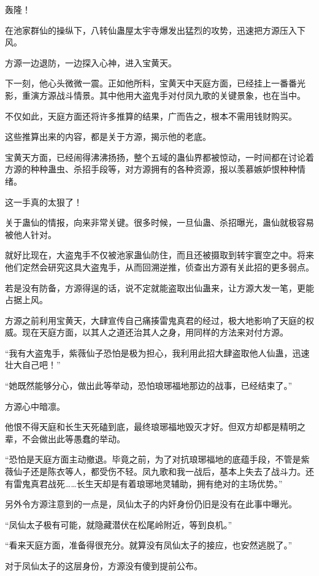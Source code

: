 \begin{this_body}
轰隆！

在池家群仙的操纵下，八转仙蛊屋太宇寺爆发出猛烈的攻势，迅速把方源压入下风。

方源一边退防，一边探入心神，进入宝黄天。

下一刻，他心头微微一震。正如他所料，宝黄天中天庭方面，已经挂上一番番光影，重演方源战斗情景。其中他用大盗鬼手对付凤九歌的关键景象，也在当中。

不仅如此，天庭方面还将许多推算的结果，广而告之，根本不需用钱财购买。

这些推算出来的内容，都是关于方源，揭示他的老底。

宝黄天方面，已经闹得沸沸扬扬，整个五域的蛊仙界都被惊动，一时间都在讨论着方源的种种蛊虫、杀招手段等，对方源拥有的各种资源，报以羡慕嫉妒恨种种情绪。

这一手真的太狠了！

关于蛊仙的情报，向来非常关键。很多时候，一旦仙蛊、杀招曝光，蛊仙就极容易被他人针对。

就好比现在，大盗鬼手不仅被池家蛊仙防住，而且还被摄取到转宇寰空之中。将来他们定然会研究这具大盗鬼手，从而回溯逆推，侦查出方源有关此招的更多弱点。

若是没有防备，方源得逞的话，说不定就能盗取出仙蛊来，让方源大发一笔，更能占据上风。

方源之前利用宝黄天，大肆宣传自己痛揍雷鬼真君的经过，极大地影响了天庭的权威。现在天庭方面，以其人之道还治其人之身，用同样的方法来对付方源。

“我有大盗鬼手，紫薇仙子恐怕是极为担心，我利用此招大肆盗取他人仙蛊，迅速壮大自己吧！”

“她既然能够分心，做出此等举动，恐怕琅琊福地那边的战事，已经结束了。”

方源心中暗凛。

他恨不得天庭和长生天死磕到底，最终琅琊福地毁灭才好。但双方却都是精明之辈，不会做出此等愚蠢的举动。

“恐怕是天庭方面主动撤退。毕竟之前，为了对抗琅琊福地的底蕴手段，不管是紫薇仙子还是陈衣等人，都受伤不轻。凤九歌和我一战后，基本上失去了战斗力。还有雷鬼真君战死……长生天却是有着琅琊地灵辅助，拥有绝对的主场优势。”

另外令方源注意到的一点是，凤仙太子的内奸身份仍旧是没有在此事中曝光。

“凤仙太子极有可能，就隐藏潜伏在松尾岭附近，等到良机。”

“看来天庭方面，准备得很充分。就算没有凤仙太子的接应，也安然逃脱了。”

对于凤仙太子的这层身份，方源没有傻到提前公布。


\end{this_body}
